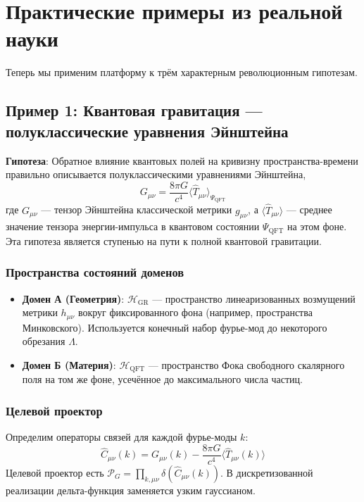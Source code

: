 \documentclass[11pt,a4paper]{article}
\begin{document}
\section{Практические примеры из реальной науки}

Теперь мы применим платформу к трём характерным революционным гипотезам.

\subsection{Пример 1: Квантовая гравитация — полуклассические уравнения Эйнштейна}

\textbf{Гипотеза}: Обратное влияние квантовых полей на кривизну пространства-времени правильно описывается полуклассическими уравнениями Эйнштейна,
\begin{equation}
G_{\mu\nu} = \frac{8\pi G}{c^4} \langle \hat{T}_{\mu\nu} \rangle_{\Psi_{\text{QFT}}}
\end{equation}
где \(G_{\mu\nu}\) — тензор Эйнштейна классической метрики \(g_{\mu\nu}\), а \(\langle \hat{T}_{\mu\nu} \rangle\) — среднее значение тензора энергии-импульса в квантовом состоянии \(\Psi_{\text{QFT}}\) на этом фоне. Эта гипотеза является ступенью на пути к полной квантовой гравитации.

\subsubsection{Пространства состояний доменов}
\begin{itemize}
    \item \textbf{Домен А (Геометрия)}: \(\mathcal{H}_{\text{GR}}\) — пространство линеаризованных возмущений метрики \(h_{\mu\nu}\) вокруг фиксированного фона (например, пространства Минковского). Используется конечный набор фурье-мод до некоторого обрезания \(\Lambda\).
    \item \textbf{Домен Б (Материя)}: \(\mathcal{H}_{\text{QFT}}\) — пространство Фока свободного скалярного поля на том же фоне, усечённое до максимального числа частиц.
\end{itemize}

\subsubsection{Целевой проектор}
Определим операторы связей для каждой фурье-моды \(k\):
\[
\hat{C}_{\mu\nu}(k) = G_{\mu\nu}(k) - \frac{8\pi G}{c^4} \langle \hat{T}_{\mu\nu}(k) \rangle
\]
Целевой проектор есть \(\mathcal{P}_G = \prod_{k,\mu\nu} \delta(\hat{C}_{\mu\nu}(k))\). В дискретизованной реализации дельта-функция заменяется узким гауссианом.
\end{document}
